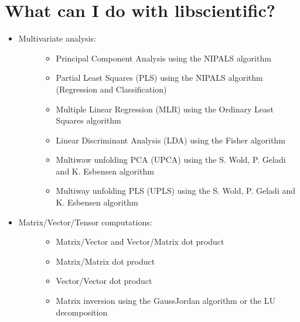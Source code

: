 \documentclass[letterpaper,10pt,english]{sphinxmanual}
\begin{document}
\section{What can I do with libscientific?}
\label{\detokenize{Overview:what-can-i-do-with-libscientific}}\begin{itemize}
\item {} \begin{description}
\item[{Multivariate analysis:}] \leavevmode\begin{itemize}
\item {} 
\sphinxAtStartPar
Principal Component Analysis using the NIPALS algorithm

\item {} 
\sphinxAtStartPar
Partial Least Squares (PLS) using the NIPALS algorithm (Regression and Classification)

\item {} 
\sphinxAtStartPar
Multiple Linear Regression (MLR) using the Ordinary Least Squares algorithm

\item {} 
\sphinxAtStartPar
Linear Discriminant Analysis (LDA) using the Fisher algorithm

\item {} 
\sphinxAtStartPar
Multi\sphinxhyphen{}waw unfolding PCA (UPCA) using the S. Wold, P. Geladi and K. Esbensen algorithm

\item {} 
\sphinxAtStartPar
Multi\sphinxhyphen{}way unfolding PLS (UPLS) using the S. Wold, P. Geladi and K. Esbensen algorithm

\end{itemize}

\end{description}

\item {} \begin{description}
\item[{Matrix/Vector/Tensor computations:}] \leavevmode\begin{itemize}
\item {} 
\sphinxAtStartPar
Matrix/Vector and Vector/Matrix dot product

\item {} 
\sphinxAtStartPar
Matrix/Matrix dot product

\item {} 
\sphinxAtStartPar
Vector/Vector dot product

\item {} 
\sphinxAtStartPar
Matrix inversion using the Gauss\sphinxhyphen{}Jordan algorithm or the LU decomposition


\end{itemize}
\end{description}
\end{itemize}
\end{document}
